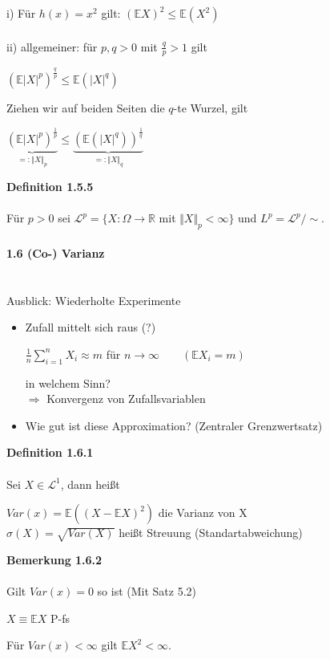 \documentclass[10pt,a4paper]{report}
\numberwithin{equation}{section}
\numberwithin{figure}{section}
\theoremstyle{plain}
\theoremstyle{definition}
\theoremstyle{plain}
\theoremstyle{definition}
\theoremstyle{remark}
\theoremstyle{plain}
\begin{document}
i) Für $h(x)=x^2$ gilt: $(\mathbb{E}X)^2\leq \mathbb{E}(X^2)$\\\\
ii) allgemeiner: für $p,q>0$ mit $\frac{q}{p}>1$ gilt
\begin{center}
$(\mathbb{E}|X|^p)^\frac{q}{p} \leq \mathbb{E}(|X|^q)$
\end{center} 
Ziehen wir auf beiden Seiten die $q$-te Wurzel, gilt
\begin{center}
$\underbrace{(\mathbb{E}|X|^p)^\frac{1}{p}}_{=:\Vert X\Vert_p}\leq\underbrace{(\mathbb{E}(|X|^q))^\frac{1}{q}}_{=:\Vert X\Vert_q}$ 
\end{center}
\textbf{Definition 1.5.5}\\\\
Für $p>0$ sei $\mathcal{L}^p=\{X:\Omega \to \mathbb{R}$ mit $\Vert X\Vert_p<\infty\}$ und $L^p=\mathcal{L}^p/\sim$.\\\\
\Large{\textbf{1.6 (Co-) Varianz}}\normalsize\\\\\\
Ausblick: Wiederholte Experimente
\begin{itemize}
\item Zufall mittelt sich raus (?)
\begin{center}
$\frac{1}{n}\sum\limits_{i=1}^nX_i\approx m$ für $ n\to \infty \qquad (\mathbb{E}X_i=m)$  
\end{center}
in welchem Sinn?\\
$\Rightarrow$ Konvergenz von Zufallsvariablen
\item Wie gut ist diese Approximation? (Zentraler Grenzwertsatz)
\end{itemize}
\textbf{Definition 1.6.1}\\\\
Sei $X \in \mathcal{L}^1$, dann heißt 
\begin{center}
$Var(x)=\mathbb{E}((X-\mathbb{E}X)^2)$ die Varianz von X\\
$\sigma(X)=\sqrt{Var(X)}$ heißt Streuung (Standartabweichung)
\end{center} 
\textbf{Bemerkung 1.6.2}\\\\
Gilt $Var(x)=0$ so ist (Mit Satz 5.2)
\begin{center}
$X\equiv \mathbb{E}X$ P-fs
\end{center}
Für $Var(x)<\infty$ gilt $\mathbb{E}X^2< \infty$.\\\\
\end{document}

